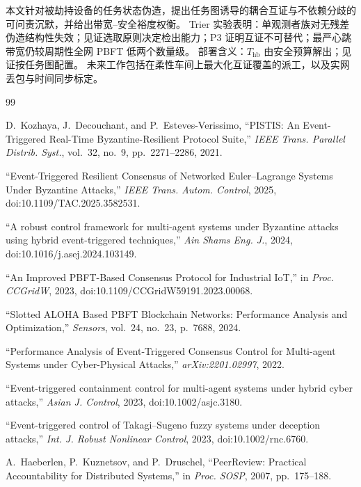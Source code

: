 \documentclass[manuscript,screen,review]{acmart}
\begin{document}
本文针对被劫持设备的任务状态伪造，提出任务图诱导的耦合互证与不依赖分歧的可问责沉默，并给出带宽--安全裕度权衡。
Trier 实验表明：单观测者族对无残差伪造结构性失效；见证选取原则决定检出能力；P3 证明互证不可替代；最严心跳带宽仍较周期性全网 PBFT 低两个数量级。
部署含义：$T_{\mathrm{hb}}$ 由安全预算解出；见证按任务图配置。
未来工作包括在柔性车间上最大化互证覆盖的派工，以及实网丢包与时间同步标定。

\begin{thebibliography}{99}

D.~Kozhaya, J.~Decouchant, and P.~Esteves-Verissimo,
``PISTIS: An Event-Triggered Real-Time Byzantine-Resilient Protocol Suite,''
\textit{IEEE Trans. Parallel Distrib. Syst.}, vol.~32, no.~9, pp.~2271--2286, 2021.

``Event-Triggered Resilient Consensus of Networked Euler--Lagrange Systems Under Byzantine Attacks,''
\textit{IEEE Trans. Autom. Control}, 2025, doi:10.1109/TAC.2025.3582531.

``A robust control framework for multi-agent systems under Byzantine attacks using hybrid event-triggered techniques,''
\textit{Ain Shams Eng. J.}, 2024, doi:10.1016/j.asej.2024.103149.

``An Improved PBFT-Based Consensus Protocol for Industrial IoT,''
in \textit{Proc. CCGridW}, 2023, doi:10.1109/CCGridW59191.2023.00068.

``Slotted ALOHA Based PBFT Blockchain Networks: Performance Analysis and Optimization,''
\textit{Sensors}, vol.~24, no.~23, p.~7688, 2024.

``Performance Analysis of Event-Triggered Consensus Control for Multi-agent Systems under Cyber-Physical Attacks,''
\textit{arXiv:2201.02997}, 2022.

``Event-triggered containment control for multi-agent systems under hybrid cyber attacks,''
\textit{Asian J. Control}, 2023, doi:10.1002/asjc.3180.

``Event-triggered control of Takagi--Sugeno fuzzy systems under deception attacks,''
\textit{Int. J. Robust Nonlinear Control}, 2023, doi:10.1002/rnc.6760.

A.~Haeberlen, P.~Kuznetsov, and P.~Druschel,
``PeerReview: Practical Accountability for Distributed Systems,''
in \textit{Proc. SOSP}, 2007, pp.~175--188.


\end{thebibliography}
\end{document}
